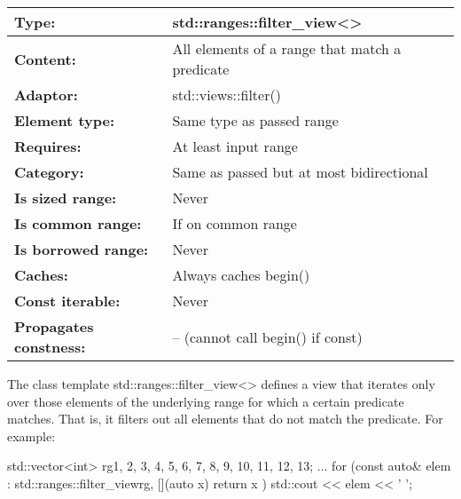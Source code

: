 
\begin{longtable}[c]{|l|l|}
\hline
\textbf{Type:}                 & std::ranges::filter\_view\textless{}\textgreater{} \\ \hline
\endfirsthead
%
\endhead
%
\textbf{Content:}              & All elements of a range that match a predicate     \\ \hline
\textbf{Adaptor:}              & std::views::filter()                               \\ \hline
\textbf{Element type:}         & Same type as passed range                          \\ \hline
\textbf{Requires:}             & At least input range                               \\ \hline
\textbf{Category:}             & Same as passed but at most bidirectional           \\ \hline
\textbf{Is sized range:}       & Never                                              \\ \hline
\textbf{Is common range:}      & If on common range                                 \\ \hline
\textbf{Is borrowed range:}    & Never                                              \\ \hline
\textbf{Caches:}               & Always caches begin()                              \\ \hline
\textbf{Const iterable:}       & Never                                              \\ \hline
\textbf{Propagates constness:} & -- (cannot call begin() if const)                  \\ \hline
\end{longtable}

The class template std::ranges::filter\_view<> defines a view that iterates only over those elements of the underlying range for which a certain predicate matches. That is, it filters out all elements that do not match the predicate. For example:

\begin{cpp}
std::vector<int> rg{1, 2, 3, 4, 5, 6, 7, 8, 9, 10, 11, 12, 13};
...
for (const auto& elem : std::ranges::filter_view{rg, [](auto x) {
							return x %
					}}) {
	std::cout << elem << ' ';
}
\end{cpp}

